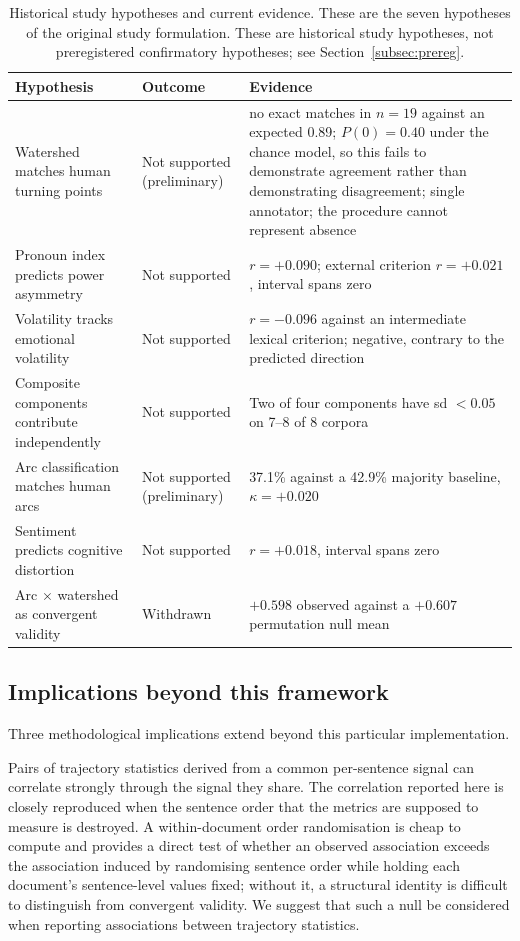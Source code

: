 \documentclass[fleqn,10pt]{wlscirep}
\providecommand{\botrule}{\bottomrule}
\begin{document}
\begin{table}[ht]
\centering
\small
\caption{Historical study hypotheses and current evidence. These are the seven hypotheses of the original study formulation. These are historical study hypotheses, not preregistered confirmatory hypotheses; see Section~\ref{subsec:prereg}.}
\label{tab:scoreboard}
\begin{tabular}{p{4.1cm}p{2.6cm}p{6.6cm}}
\toprule
Hypothesis & Outcome & Evidence \\
\midrule
Watershed matches human turning points & Not supported (preliminary) & no exact matches in $n=19$ against an expected 0.89; $P(0)=0.40$ under the chance model, so this fails to demonstrate agreement rather than demonstrating disagreement; single annotator; the procedure cannot represent absence \\
Pronoun index predicts power asymmetry & Not supported & $r=+0.090$; external criterion $r=+0.021$, interval spans zero \\
Volatility tracks emotional volatility & Not supported & $r=-0.096$ against an intermediate lexical criterion; negative, contrary to the predicted direction \\
Composite components contribute independently & Not supported & Two of four components have sd $<0.05$ on 7--8 of 8 corpora \\
Arc classification matches human arcs & Not supported (preliminary) & 37.1\% against a 42.9\% majority baseline, $\kappa=+0.020$ \\
Sentiment predicts cognitive distortion & Not supported & $r=+0.018$, interval spans zero \\
Arc $\times$ watershed as convergent validity & Withdrawn & $+0.598$ observed against a $+0.607$ permutation null mean \\
\botrule
\end{tabular}
\end{table}

\subsection{Implications beyond this framework}

Three methodological implications extend beyond this particular implementation.

Pairs of trajectory statistics derived from a common per-sentence signal can correlate strongly through the signal they share. The correlation reported here is closely reproduced when the sentence order that the metrics are supposed to measure is destroyed. A within-document order randomisation is cheap to compute and provides a direct test of whether an observed association exceeds the association induced by randomising sentence order while holding each document's sentence-level values fixed; without it, a structural identity is difficult to distinguish from convergent validity. We suggest that such a null be considered when reporting associations between trajectory statistics.
\end{document}
